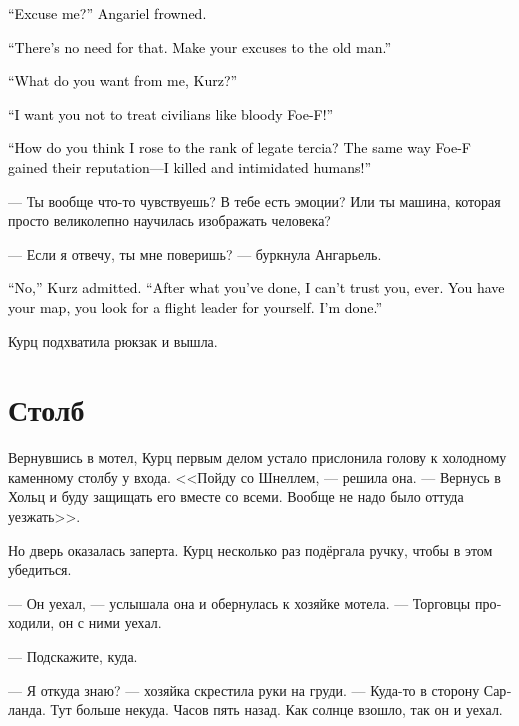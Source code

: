 \documentclass[a4paper,12pt,fleqn]{book}\usepackage{cooltooltips}\usepackage{polyglossia}\setdefaultlanguage[babelshorthands=true]{russian}\setotherlanguage{english}\defaultfontfeatures{Ligatures=TeX,Mapping=tex-text} \usepackage{xcolor}\definecolor{lightgray}{HTML}{bbbbbb}\color{lightgray}\newcommand{\ml}[3]{\textenglish{\textcolor{black}{#3}}}
\begin{document}
\ml{$0$}
{--- Прости? --- нахмурилась Ангарьель.}
{``Excuse me?'' Angariel frowned.}

\ml{$0$}
{--- Не извиняйся передо мной.}
{``There's no need for that.}
\ml{$0$}
{Лучше перед стариком иди извинись.}
{Make your excuses to the old man.''}

\ml{$0$}
{--- Что ты от меня хочешь, Курц?}
{``What do you want from me, Kurz?''}

\ml{$0$}
{--- Я хочу, чтобы ты не уподоблялась Фоу-Ф в обращении с мирными жителями!}
{``I want you not to treat civilians like bloody Foe-F!''}

\ml{$0$}
{--- Как, по-твоему, я стала легатом терция?}
{``How do you think I rose to the rank of legate tercia?}
\ml{$0$}
{Точно так же, как и Фоу-Ф приобрели свою славу --- убивая людей и нагоняя на них страх!}
{The same way Foe-F gained their reputation---I killed and intimidated humans!''}

--- Ты вообще что-то чувствуешь?
В тебе есть эмоции?
Или ты машина, которая просто великолепно научилась изображать человека?

--- Если я отвечу, ты мне поверишь? --- буркнула Ангарьель.

\ml{$0$}
{--- Нет, --- признала Курц.}
{``No,'' Kurz admitted.}
\ml{$0$}
{--- После того, что ты сделала, я вообще не могу тебе верить.}
{``After what you've done, I can't trust you, ever.}
\ml{$0$}
{Карта у тебя, координатора для перелёта ищи сама.}
{You have your map, you look for a flight leader for yourself.}
\ml{$0$}
{С меня хватит.}
{I'm done.''}

Курц подхватила рюкзак и вышла.

\section{Столб}

Вернувшись в мотел, Курц первым делом устало прислонила голову к холодному каменному столбу у входа.
<<Пойду со Шнеллем, --- решила она.
--- Вернусь в Хольц и буду защищать его вместе со всеми.
Вообще не надо было оттуда уезжать>>.

Но дверь оказалась заперта.
Курц несколько раз подёргала ручку, чтобы в этом убедиться.

--- Он уехал, --- услышала она и обернулась к хозяйке мотела.
--- Торговцы проходили, он с ними уехал.

--- Подскажите, куда.

--- Я откуда знаю? --- хозяйка скрестила руки на груди.
--- Куда-то в сторону Сарланда.
Тут больше некуда.
Часов пять назад.
Как солнце взошло, так он и уехал.
\end{document}
